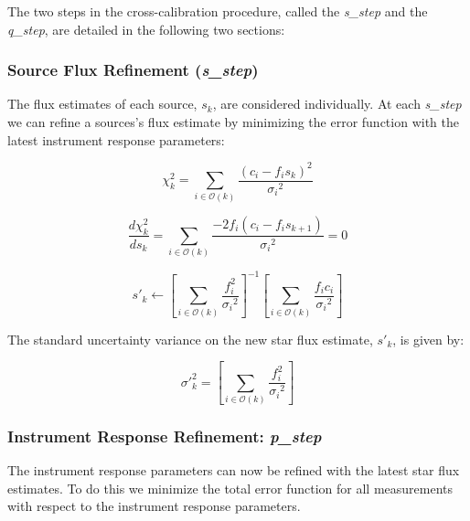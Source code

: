 \documentclass[manuscript]{aastex}
\begin{document}
\noindent{}The two steps in the cross-calibration procedure, called the \textit{s\_step} and the \textit{q\_step}, are detailed in the following two sections:

\subsubsection{Source Flux Refinement (\textit{s\_step})}
The flux estimates of each source, $s_k$, are considered individually. At each \textit{s\_step} we can refine a sources's flux estimate by minimizing the error function with the latest instrument response parameters:

\begin{displaymath}
\chi^2_{k} = \sum_{i \in \mathcal{O}(k)} \frac{(c_i-f_{i}s_{k})^2}{{\sigma_i}^2}
\end{displaymath}

\begin{displaymath}
\frac{d\chi^2_{k}}{d s_{k}} = \sum_{i \in \mathcal{O}(k)} \frac{-2 f_{i} (c_i-f_{i}s_{k+1})}{{\sigma_i}^2} = 0
\end{displaymath}

\begin{displaymath}
s'_{k} \leftarrow \left[{\sum_{i \in \mathcal{O}(k)}  \frac{f_{i}^2}{{\sigma_i}^2}} \right]^{-1}  \left[ {\sum_{i \in \mathcal{O}(k)} \frac{f_{i} c_i}{{\sigma_i}^2}} \right]
\end{displaymath}

The standard uncertainty variance on the new star flux estimate, $s'_{k}$, is given by:

\begin{displaymath}
\sigma'^2_k = \left[{\sum_{i \in \mathcal{O}(k)}  \frac{f_{i}^2}{{\sigma_i}^2}} \right]
\end{displaymath}


\subsubsection{Instrument Response Refinement: \textbf{\textit{p\_step}}}
The instrument response parameters can now be refined with the latest star flux estimates. To do this we minimize the total error function for all measurements with respect to the instrument response parameters.
\end{document}
